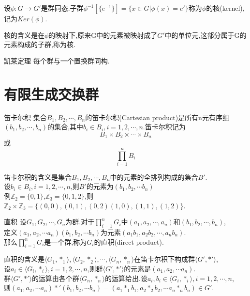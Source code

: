 \documentclass[oneside,openany]{ctexbook}
\begin{document}
\begin{definition}{}{}
设$\phi :G\rightarrow G'$是群同态.子群$\phi ^{-1}[\{e^{-1}\}]=\{x\in G|\phi (x)=e'\}$称为$\phi$的核(kernel),\\
记为$Ker(\phi)$.
\end{definition}

核的含义是在$\phi$的映射下,原来G中的元素被映射成了$G'$中的单位元,这部分属于G的元素构成的子群,称为核.

\begin{definition}{凯莱定理}{}
每个群与一个置换群同构.
\end{definition}

\section{有限生成交换群}

\begin{definition}{笛卡尔积}{}
集合$B_1,B_2,\cdots ,B_n$的笛卡尔积(Cartesian product)是所有n元有序组$(b_1,b_2,\cdots ,b_n)$的集合,其中$b_i\in B_i,i=1,2,\cdots ,n$.笛卡尔积记为
$$B_1\times B_2\times \cdots \times B_n$$或$$\prod ^n_{i=1}B_i$$
\end{definition}

笛卡尔积的含义是集合$B_1,B_2,\cdots ,B_n$中的元素的全排列构成的集合$B'$.\\
设$b_i\in B_i,i=1,2,\cdots ,n$,则$B'$的元素为$(b_1,b_2,\cdots b_n)$\\
例$\mathbb{Z}_2=\{0,1\}$,$\mathbb{Z}_3=\{0,1,2\}$,则$\mathbb{Z}_2 \times \mathbb{Z}_3=\{(0,0),(0,1),(0,2)(1,0),(1,1),(1,2)\}$.

\begin{definition}{直积}{}
设$G_1,G_2,\cdots ,G_n$为群.对于$\prod ^n_{i=1}G_i$中$(a_1,a_2,\cdots ,a_n)$和$(b_1,b_2,\cdots ,b_n)$,\\
定义$(a_1,a_2,\cdots a_n)(b_1,b_2,\cdots b_n)$为元素$(a_1b_1,a_2b_2,\cdots ,a_nb_n)$.\\
那么$\prod ^n_{i=1}G_i$是一个群,称为$G_i$的直积(direct product).
\end{definition}

直积的含义是$\langle G_1,*_1\rangle,\langle G_2,*_2\rangle,\cdots ,\langle G_n,*_n\rangle$在笛卡尔积下构成群$\langle G',*'\rangle$,\\
设$a_i\in \langle G_i,*_i\rangle,i=1,2,\cdots ,n$,则群$\langle G',*'\rangle$的元素是$(a_1, a_2,\cdots a_n)$.\\
群$\langle G',*'\rangle$的运算由各个群$\langle G_n,*_n\rangle$的运算给出.设$a_i,b_i\in \langle G_i,*_i\rangle,i=1,2,\cdots ,n$,\\则$(a_1, a_2,\cdots a_n)*'(b_1, b_2,\cdots b_n)=(a_1 *_1 b_1, a_2 *_2 b_2,\cdots a_n*_n b_n) \in G'$.
\end{document}
